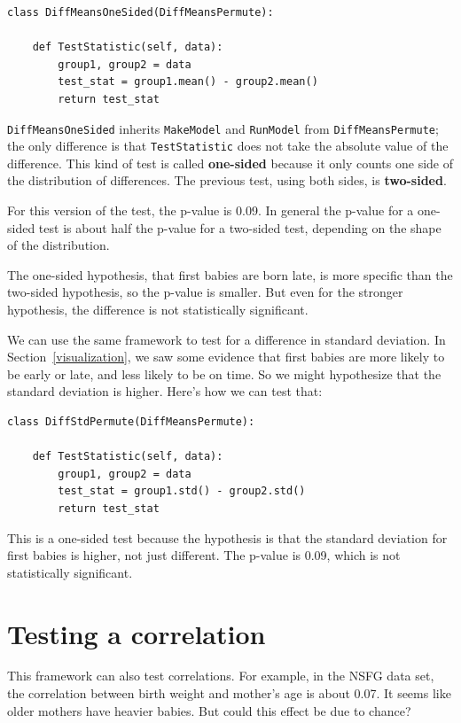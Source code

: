 \documentclass[12pt]{book}
\begin{document}
\begin{verbatim}
class DiffMeansOneSided(DiffMeansPermute):

    def TestStatistic(self, data):
        group1, group2 = data
        test_stat = group1.mean() - group2.mean()
        return test_stat
\end{verbatim}

{\tt DiffMeansOneSided} inherits {\tt MakeModel} and {\tt RunModel}
from {\tt DiffMeansPermute}; the only difference is that
{\tt TestStatistic} does not take the absolute value of the
difference.  This kind of test is called {\bf one-sided} because
it only counts one side of the distribution of differences.  The
previous test, using both sides, is {\bf two-sided}.

For this version of the test, the p-value is 0.09.  In general
the p-value for a one-sided test is about half the p-value for
a two-sided test, depending on the shape of the distribution.

The one-sided hypothesis, that first babies are born late, is more
specific than the two-sided hypothesis, so the p-value is smaller.
But even for the stronger hypothesis, the difference is
not statistically significant.

We can use the same framework to test for a difference in standard
deviation.  In Section~\ref{visualization}, we saw some evidence that
first babies are more likely to be early or late, and less likely to
be on time.  So we might hypothesize that the standard deviation is
higher.  Here's how we can test that:

\begin{verbatim}
class DiffStdPermute(DiffMeansPermute):

    def TestStatistic(self, data):
        group1, group2 = data
        test_stat = group1.std() - group2.std()
        return test_stat
\end{verbatim}

This is a one-sided test because the hypothesis is that the standard
deviation for first babies is higher, not just different.  The p-value
is 0.09, which is not statistically significant.


\section{Testing a correlation}
\label{corrtest}

This framework can also test correlations.  For example, in the NSFG
data set, the correlation between birth weight and mother's age is
about 0.07.  It seems like older mothers have heavier babies.  But
could this effect be due to chance?
\end{document}
